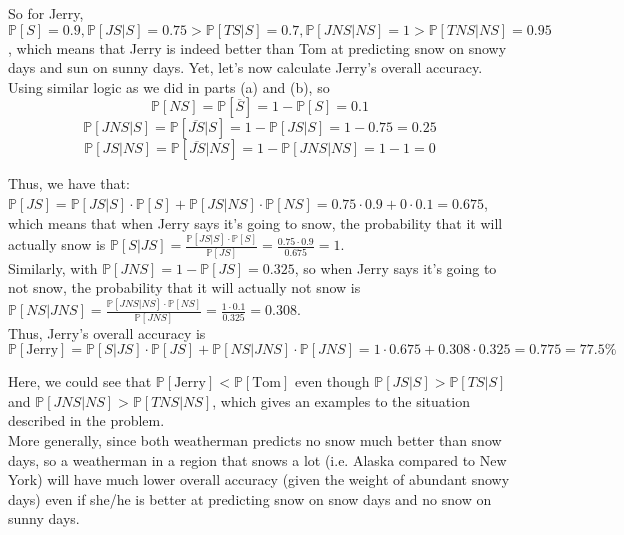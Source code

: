 \documentclass{article}
\begin{document}
So for Jerry,
$\mathbb{P}[S] = 0.9,
\mathbb{P}[JS|S] = 0.75 > \mathbb{P}[TS|S] = 0.7,
\mathbb{P}[JNS|NS] = 1 > \mathbb{P}[TNS|NS] = 0.95$,
which means that Jerry is indeed better than Tom at predicting snow on snowy days and sun on sunny days. Yet, let's now calculate Jerry's overall accuracy. \\

Using similar logic as we did in parts (a) and (b), so $$\mathbb{P}[NS] = \mathbb{P}[\overline{S}] = 1 - \mathbb{P}[S] = 0.1$$
$$\mathbb{P}[JNS|S] = \mathbb{P}[\overline{JS}|S] = 1 - \mathbb{P}[JS|S] = 1 - 0.75 = 0.25$$
$$\mathbb{P}[JS|NS] = \mathbb{P}[\overline{JS}|NS] = 1 - \mathbb{P}[JNS|NS] = 1 - 1 = 0$$

Thus, we have that:
$\mathbb{P}[JS] =
\mathbb{P}[JS|S]\cdot\mathbb{P}[S] + \mathbb{P}[JS|NS]\cdot\mathbb{P}[NS] =
0.75\cdot0.9 + 0\cdot0.1 = 0.675$, which means that when Jerry says it's going to snow, the probability that it will actually snow is
$\mathbb{P}[S|JS] = \frac{\mathbb{P}[JS|S]\cdot\mathbb{P}[S]}{\mathbb{P}[JS]} = \frac{0.75\cdot0.9}{0.675} = 1$. \\

Similarly, with $\mathbb{P}[JNS] = 1 - \mathbb{P}[JS] = 0.325$, so when Jerry says it's going to not snow, the probability that it will actually not snow is
$\mathbb{P}[NS|JNS] = \frac{\mathbb{P}[JNS|NS]\cdot\mathbb{P}[NS]}{\mathbb{P}[JNS]} = 
\frac{1\cdot0.1} {0.325} = 0.308$. \\

Thus, Jerry's overall accuracy is
$$\mathbb{P}[\text{Jerry}] =
\mathbb{P}[S|JS]\cdot\mathbb{P}[JS] + \mathbb{P}[NS|JNS]\cdot\mathbb{P}[JNS] = 
1\cdot0.675 + 0.308\cdot0.325 = 0.775 = 77.5\%$$

Here, we could see that $\mathbb{P}[\text{Jerry}] < \mathbb{P}[\text{Tom}]$ even though $\mathbb{P}[JS|S] > \mathbb{P}[TS|S]$ and $\mathbb{P}[JNS|NS] > \mathbb{P}[TNS|NS]$, which gives an examples to the situation described in the problem. \\

More generally, since both weatherman predicts no snow much better than snow days, so a weatherman in a region that snows a lot (i.e. Alaska compared to New York) will have much lower overall accuracy (given the weight of abundant snowy days) even if she/he is better at predicting snow on snow days and no snow on sunny days.
\end{document}
